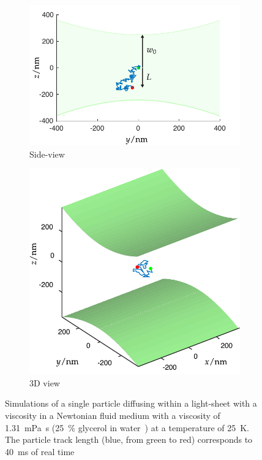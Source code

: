 \begin{figure}
  \centering
  \begin{subfigure}[t]{0.8\linewidth}
    \centering
    \includegraphics{./simulation/size_view_diffusion}
    \caption{Side-view}
    \label{fig:size_view_diffusion}
  \end{subfigure}
  \begin{subfigure}[t]{0.8\linewidth}
    \centering
    \includegraphics{simulation/size_view_diffusion_3d_bigger}
    \caption{3D view}
    \label{fig:diffusion_3d}
  \end{subfigure}
  \caption{Simulations of a single particle diffusing within a light-sheet with a viscosity
  in a Newtonian fluid medium with a viscosity of \SI{1.31}{\milli\pascal\second} (\SI{25}{\percent} glycerol in water~\cite{segurViscosityGlycerolIts1951}) at a temperature of \SI{25}{\kelvin}.
  The particle track length (blue, from green to red) corresponds to \SI{40}{\milli\second} of real time}\label{fig:diffusion}
\end{figure}

